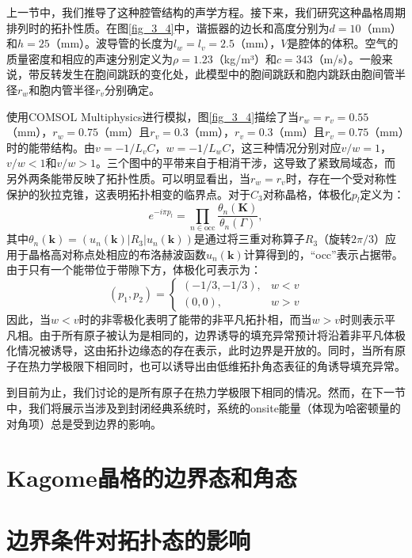 上一节中，我们推导了这种腔管结构的声学方程。接下来，我们研究这种晶格周期排列时的拓扑性质。在图\ref{fig_3_4}中，谐振器的边长和高度分别为$d = 10$（mm）和$h = 25$（mm）。波导管的长度为$l_w = l_v = 2.5$（mm），$V$是腔体的体积。空气的质量密度和相应的声速分别定义为$\rho = 1.23$（kg/m³）和$c = 343$（m/s）。一般来说，带反转发生在胞间跳跃的变化处，此模型中的胞间跳跃和胞内跳跃由胞间管半径$r_w$和胞内管半径$r_v$分别确定。

使用COMSOL Multiphysics进行模拟，图\ref{fig_3_4}描绘了当$r_w = r_v = 0.55$（mm），$r_w = 0.75$（mm）且$r_v = 0.3$（mm），$r_v = 0.3$（mm）且$r_v = 0.75$（mm）时的能带结构。由$v = -1/L_vC$，$w = -1/L_wC$，这三种情况分别对应$v/w=1$，$v/w<1$和$v/w>1$。三个图中的平带来自于相消干涉，这导致了紧致局域态，而另外两条能带反映了拓扑性质。可以明显看出，当$r_w = r_v$时，存在一个受对称性保护的狄拉克锥，这表明拓扑相变的临界点。对于$C_3$对称晶格，体极化$p_l$定义为：
\begin{equation} \label{eq3-8}
  e^{-i\pi p_l} = \prod_{n \in \text{occ}} \frac{\theta_n(\mathbf{K})}{\theta_n(\Gamma)},
\end{equation}
其中$\theta_n(\mathbf{k}) = (u_n(\mathbf{k})|R_{3}|u_n(\mathbf{k}))$是通过将三重对称算子$R_3$（旋转$2\pi/3$）应用于晶格高对称点处相应的布洛赫波函数$u_n(\mathbf{k})$计算得到的，“occ”表示占据带。由于只有一个能带位于带隙下方，体极化可表示为：
\begin{equation} \label{eq3-9}
  (p_1,p_2) = 
  \begin{cases}
  (-1/3,-1/3), & w < v \\
  (0,0), & w > v
  \end{cases}
\end{equation}
因此，当$w < v$时的非零极化表明了能带的非平凡拓扑相，而当$w > v$时则表示平凡相。由于所有原子被认为是相同的，边界诱导的填充异常预计将沿着非平凡体极化情况被诱导，这由拓扑边缘态的存在表示，此时边界是开放的。同时，当所有原子在热力学极限下相同时，也可以诱导出由低维拓扑角态表征的角诱导填充异常。

到目前为止，我们讨论的是所有原子在热力学极限下相同的情况。然而，在下一节中，我们将展示当涉及到封闭经典系统时，系统的onsite能量（体现为哈密顿量的对角项）总是受到边界的影响。

\section{Kagome晶格的边界态和角态}

\section{边界条件对拓扑态的影响}